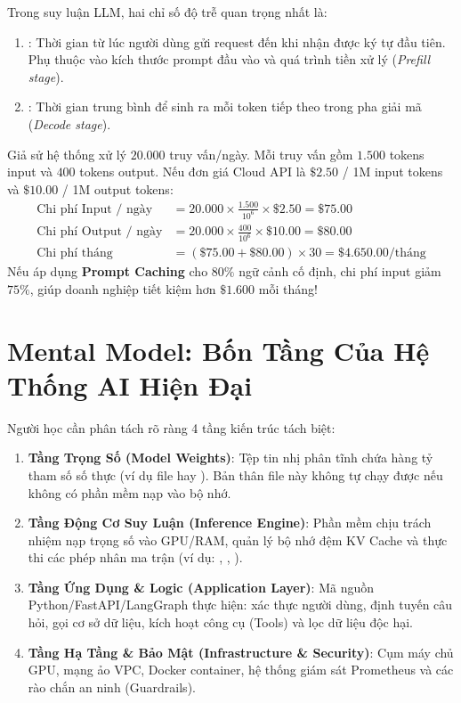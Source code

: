 \begin{workedexamplebox}
Trong suy luận LLM, hai chỉ số độ trễ quan trọng nhất là:
\begin{enumerate}
  \item {}: Thời gian từ lúc người dùng gửi request đến khi nhận được ký tự đầu tiên. Phụ thuộc vào kích thước prompt đầu vào và quá trình tiền xử lý (\textit{Prefill stage}).
  \item {}: Thời gian trung bình để sinh ra mỗi token tiếp theo trong pha giải mã (\textit{Decode stage}).
\end{enumerate}
Giả sử hệ thống xử lý $20.000$ truy vấn/ngày. Mỗi truy vấn gồm $1.500$ tokens input và $400$ tokens output.
Nếu đơn giá Cloud API là $\$2.50$ / 1M input tokens và $\$10.00$ / 1M output tokens:
\begin{align*}
\text{Chi phí Input / ngày} &= 20.000 \times \frac{1.500}{10^6} \times \$2.50 = \$75.00 \\
\text{Chi phí Output / ngày} &= 20.000 \times \frac{400}{10^6} \times \$10.00 = \$80.00 \\
\text{Chi phí tháng} &= (\$75.00 + \$80.00) \times 30 = \$4.650.00 / \text{tháng}
\end{align*}
Nếu áp dụng \textbf{Prompt Caching} cho $80\%$ ngữ cảnh cố định, chi phí input giảm $75\%$, giúp doanh nghiệp tiết kiệm hơn $\$1.600$ mỗi tháng!
\end{workedexamplebox}

\section{Mental Model: Bốn Tầng Của Hệ Thống AI Hiện Đại}
\label{sec:p0-mental-model}

Người học cần phân tách rõ ràng 4 tầng kiến trúc tách biệt:
\begin{enumerate}
  \item \textbf{Tầng Trọng Số (Model Weights)}: Tệp tin nhị phân tĩnh chứa hàng tỷ tham số số thực (ví dụ file  hay ). Bản thân file này không tự chạy được nếu không có phần mềm nạp vào bộ nhớ.
  \item \textbf{Tầng Động Cơ Suy Luận (Inference Engine)}: Phần mềm chịu trách nhiệm nạp trọng số vào GPU/RAM, quản lý bộ nhớ đệm KV Cache và thực thi các phép nhân ma trận (ví dụ: , , ).
  \item \textbf{Tầng Ứng Dụng \& Logic (Application Layer)}: Mã nguồn Python/FastAPI/LangGraph thực hiện: xác thực người dùng, định tuyến câu hỏi, gọi cơ sở dữ liệu, kích hoạt công cụ (Tools) và lọc dữ liệu độc hại.
  \item \textbf{Tầng Hạ Tầng \& Bảo Mật (Infrastructure \& Security)}: Cụm máy chủ GPU, mạng ảo VPC, Docker container, hệ thống giám sát Prometheus và các rào chắn an ninh (Guardrails).
\end{enumerate}

